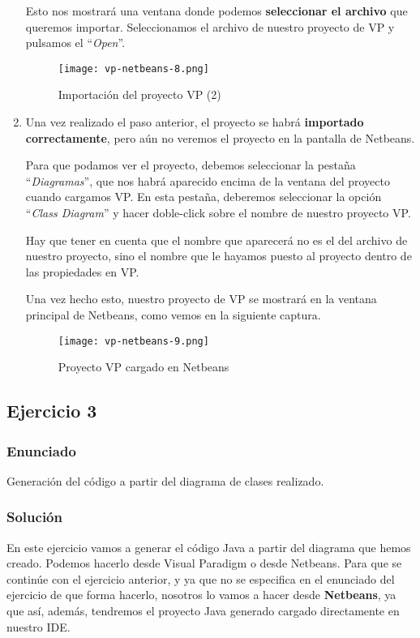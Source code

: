 \begin{enumerate}
    Esto nos mostrará una ventana donde podemos \textbf{seleccionar el archivo} que queremos importar. Seleccionamos el archivo de nuestro proyecto de VP y pulsamos el ``\textit{Open}''.

    \begin{figure}[H]
        \centering
        \texttt{[image: vp-netbeans-8.png]}
        \caption{Importación del proyecto VP (2)}
    \end{figure}

    \item Una vez realizado el paso anterior, el proyecto se habrá \textbf{importado correctamente}, pero aún no veremos el proyecto en la pantalla de Netbeans.

    Para que podamos ver el proyecto, debemos seleccionar la pestaña ``\textit{Diagramas}'', que nos habrá aparecido encima de la ventana del proyecto cuando cargamos VP. En esta pestaña, deberemos seleccionar la opción ``\textit{Class Diagram}'' y hacer doble-click sobre el nombre de nuestro proyecto VP.

    Hay que tener en cuenta que el nombre que aparecerá no es el del archivo de nuestro proyecto, sino el nombre que le hayamos puesto al proyecto dentro de las propiedades en VP.

    Una vez hecho esto, nuestro proyecto de VP se mostrará en la ventana principal de Netbeans, como vemos en la siguiente captura.

    \begin{figure}[H]
        \centering
        \texttt{[image: vp-netbeans-9.png]}
        \caption{Proyecto VP cargado en Netbeans}
    \end{figure}
\end{enumerate}

\subsection{Ejercicio 3}

\subsubsection{Enunciado}
Generación del código a partir del diagrama de clases realizado.

\subsubsection{Solución}
En este ejercicio vamos a generar el código Java a partir del diagrama que hemos creado. Podemos hacerlo desde Visual Paradigm o desde Netbeans. Para que se continúe con el ejercicio anterior, y ya que no se especifica en el enunciado del ejercicio de que forma hacerlo, nosotros lo vamos a hacer desde \textbf{Netbeans}, ya que así, además, tendremos el proyecto Java generado cargado directamente en nuestro IDE.

